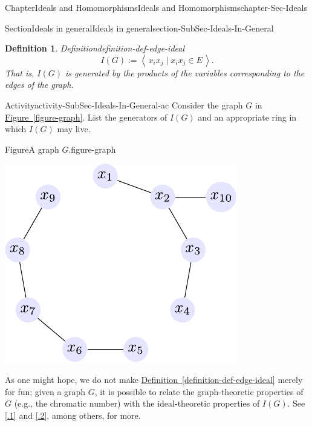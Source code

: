 \documentclass[oneside,10pt,]{book}
\newcommand{\xreffont}{\relax}
\numberwithin{equation}{section}
\newcommand{\ideal}[1]{\left\langle\, #1 \,\right\rangle}
\newtheorem{definition}[theorem]{Definition}
\begin{document}
\begin{chapterptx}{Chapter}{Ideals and Homomorphisms}{}{Ideals and Homomorphisms}{}{}{chapter-Sec-Ideals}
\begin{sectionptx}{Section}{Ideals in general}{}{Ideals in general}{}{}{section-SubSec-Ideals-In-General}
\begin{definition}{Definition}{}{definition-def-edge-ideal}
\begin{equation*}
I(G) := \ideal{x_i x_j \mid x_i x_j\in E}.
\end{equation*}
That is, \(I(G)\) is generated by the products of the variables corresponding to the edges of the graph.%
\end{definition}
\begin{activity}{Activity}{}{activity-SubSec-Ideals-In-General-ac}%
Consider the graph \(G\) in \hyperref[figure-graph]{Figure~{\xreffont\ref{figure-graph}}}. List the generators of \(I(G)\) and an appropriate ring in which \(I(G)\) may live.%
\end{activity}%
\begin{figureptx}{Figure}{A graph \(G\).}{figure-graph}{}%
\begin{image}{0.25}{0.5}{0.25}%
\includegraphics[width=\linewidth]{./images/graph.pdf}
\end{image}%
\tcblower
\end{figureptx}%
As one might hope, we do not make \hyperref[definition-def-edge-ideal]{Definition~{\xreffont\ref{definition-def-edge-ideal}}} merely for fun; given a graph \(G\), it is possible to relate the graph-theoretic properties of \(G\) (e.g., the chromatic number) with the ideal-theoretic properties of \(I(G)\). See \hyperlink{biblio-vantuyl-intro}{[{\xreffont 4.1.1}]} and \hyperlink{biblio-mfo-waldschmidt}{[{\xreffont 4.1.2}]}, among others, for more.%
%
%
\typeout{************************************************}
\typeout{************************************************}

\end{sectionptx}
\end{chapterptx}
\end{document}

